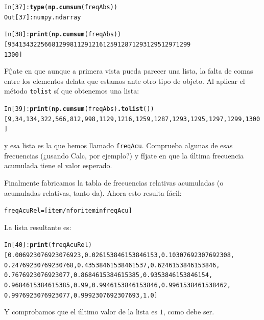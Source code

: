 \documentclass[10pt,a4paper]{article}\usepackage[]{graphicx}\usepackage[]{color}
\makeatletter
\newcommand{\hlkwd}[1]{\textcolor[rgb]{0.737,0.353,0.396}{\textbf{#1}}}%
\newenvironment{kframe}{%
 \def\at@end@of@kframe{}%
 \ifinner\ifhmode%
  \def\at@end@of@kframe{\end{minipage}}%
  \begin{minipage}{\columnwidth}%
 \fi\fi%
 \def\FrameCommand##1{\hskip\@totalleftmargin \hskip-\fboxsep
 \colorbox{shadecolor}{##1}\hskip-\fboxsep
     \hskip-\linewidth \hskip-\@totalleftmargin \hskip\columnwidth}%
 \MakeFramed {\advance\hsize-\width
   \@totalleftmargin\z@ \linewidth\hsize
   \@setminipage}}%
 {\par\unskip\endMakeFramed%
 \at@end@of@kframe}
\newenvironment{knitrout}{}{} %
\makeatother
\begin{document}
\begin{knitrout}
\color{fgcolor}\begin{kframe}
\begin{alltt}
In [37]: \hlkwd{type}(\hlkwd{np.cumsum}(freqAbs))
Out[37]: numpy.ndarray

In [38]: \hlkwd{print}(\hlkwd{np.cumsum}(freqAbs))
[   9   34  134  322  566  812  998 1129 1216 1259 1287 1293 1295 1297 1299
 1300]
\end{alltt}
\end{kframe}
\end{knitrout}
Fíjate en que aunque a primera vista pueda parecer una lista, la falta de comas entre los elementos delata que estamos ante otro tipo de objeto. Al aplicar el método {\tt tolist} sí que obtenemos una lista:
\begin{knitrout}
\color{fgcolor}\begin{kframe}
\begin{alltt}
In [39]: \hlkwd{print}(\hlkwd{np.cumsum}(freqAbs)\hlkwd{.tolist}())
[9, 34, 134, 322, 566, 812, 998, 1129, 1216, 1259, 1287, 1293, 1295, 1297, 1299, 1300]
\end{alltt}
\end{kframe}
\end{knitrout}
y esa lista es la que hemos llamado {\tt freqAcu}. Comprueba algunas de esas frecuencias (¿usando Calc, por ejemplo?) y fíjate en que la última frecuencia acumulada tiene el valor esperado.

Finalmente fabricamos la tabla de frecuencias relativas acumuladas (o acumuladas relativas, tanto da). Ahora esto resulta fácil:
\begin{knitrout}
\color{fgcolor}\begin{kframe}
\begin{alltt}
freqAcuRel = [ item/n for item in freqAcu]
\end{alltt}
\end{kframe}
\end{knitrout}
La lista resultante es:
\begin{knitrout}
\color{fgcolor}\begin{kframe}
\begin{alltt}
In [40]: \hlkwd{print}(freqAcuRel)
[0.006923076923076923, 0.026153846153846153, 0.10307692307692308,
0.24769230769230768, 0.43538461538461537, 0.6246153846153846,
0.7676923076923077, 0.8684615384615385, 0.9353846153846154,
0.9684615384615385, 0.99, 0.9946153846153846, 0.9961538461538462,
0.9976923076923077, 0.9992307692307693, 1.0]
\end{alltt}
\end{kframe}
\end{knitrout}
Y comprobamos que el último valor de la lista es $1$, como debe ser.
\end{document}

